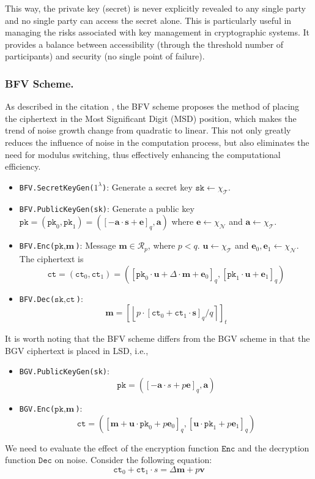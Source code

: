 \documentclass[11pt]{article}
\begin{document}
This way, the private key (secret) is never explicitly revealed to any single party and no single party can access the secret alone.
This is particularly useful in managing the risks associated with key management in cryptographic systems.
It provides a balance between accessibility (through the threshold number of participants) and security (no single point of failure).

\subsubsection{BFV Scheme.}
As described in the citation \cite{10.1007/978-3-642-32009-5_50, cryptoeprint:2012/144}, the BFV scheme proposes the method of placing the ciphertext in the Most Significant Digit (MSD) position, which makes the trend of noise growth change from quadratic to linear. This not only greatly reduces the influence of noise in the computation process, but also eliminates the need for modulus switching, thus effectively enhancing the computational efficiency.

\begin{itemize}
\item \texttt{BFV.SecretKeyGen($1^\lambda$)}: Generate a secret key $\texttt{sk}\leftarrow \chi_\mathcal{T}$.
\item \texttt{BFV.PublicKeyGen(\texttt{sk})}: Generate a public key $\texttt{pk} =(\texttt{pk}_0,\texttt{pk}_1)= \left([-\mathbf{a}\cdot\mathbf{s}+\mathbf{e}]_{q}, \mathbf{a}\right)$ where $\mathbf{e}\leftarrow \chi_\mathcal{N}$ and $\mathbf{a}\leftarrow \chi_\mathcal{T}$.
\item \texttt{BFV.Enc($\texttt{pk},\textbf{m}$)}: Message $\mathbf{m}\in \mathcal{R}_p$, where $p<q$. $\mathbf{u}\leftarrow \chi_\mathcal{T}$ and $\mathbf{e}_0, \mathbf{e}_1\leftarrow \chi_\mathcal{N}$. The ciphertext is $$\texttt{ct} = (\texttt{ct}_0,\texttt{ct}_1)=\left([\texttt{pk}_0\cdot\mathbf{u}+\Delta\cdot\mathbf{m}+\mathbf{e}_0]_{q},[\texttt{pk}_1\cdot\mathbf{u}+\mathbf{e}_1]_{q}\right)$$
\item \texttt{BFV.Dec($\texttt{sk},\texttt{ct}$)}: $$\mathbf{m}=\left[\left\lfloor p\cdot[\texttt{ct}_0+\texttt{ct}_1\cdot\mathbf{s}]_q/q\right\rceil\right]_t$$
\end{itemize}
It is worth noting that the BFV scheme differs from the BGV scheme in that the BGV ciphertext is placed in LSD, i.e.,
\begin{itemize}
\item \texttt{BGV.PublicKeyGen(\texttt{sk})}: $$\texttt{pk}=([-\mathbf{a}\cdot{s}+p\mathbf{e}]_q, \mathbf{a})$$
\item \texttt{BGV.Enc($\texttt{pk},\textbf{m}$)}: $$\texttt{ct}=([ \mathbf{m}+\mathbf{u}\cdot\texttt{pk}_0+p\mathbf{e}_0]_q,[\mathbf{u}\cdot\texttt{pk}_1+p\mathbf{e}_1]_q)$$
\end{itemize}
We need to evaluate the effect of the encryption function $\texttt{Enc}$ and the decryption function $\texttt{Dec}$ on noise. Consider the following equation:
\begin{equation}
\texttt{ct}_0+\texttt{ct}_1\cdot{s}=\Delta\mathbf{m}+p\mathbf{v}
\end{equation}
\end{document}
